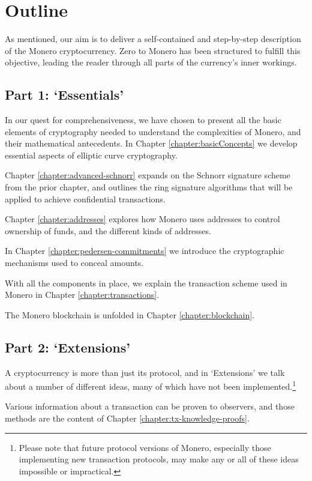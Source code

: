 \section{Outline}

As mentioned, our aim is to deliver a self-contained and step-by-step description of the Monero cryptocurrency. Zero to Monero has been structured to fulfill this objective, leading the reader through all parts of the currency’s inner workings.


\subsection{Part 1: `Essentials'}

In our quest for comprehensiveness, we have chosen to present all the basic elements of cryptography needed to understand the complexities of Monero, and their mathematical antecedents. In Chapter \ref{chapter:basicConcepts} we develop essential aspects of elliptic curve cryptography.

Chapter \ref{chapter:advanced-schnorr} expands on the Schnorr signature scheme from the prior chapter, and outlines the ring signature algorithms that will be applied to achieve confidential transactions.

Chapter \ref{chapter:addresses} explores how Monero uses addresses to control ownership of funds, and the different kinds of addresses.

In Chapter \ref{chapter:pedersen-commitments} we introduce the cryptographic mechanisms used to conceal amounts.

With all the components in place, we explain the transaction scheme used in Monero in Chapter \ref{chapter:transactions}.

The Monero blockchain is unfolded in Chapter \ref{chapter:blockchain}.


\subsection{Part 2: `Extensions'}

A cryptocurrency is more than just its protocol, and in `Extensions' we talk about a number of different ideas, many of which have not been implemented.\footnote{Please note that future protocol versions of Monero, especially those implementing new transaction protocols, may make any or all of these ideas impossible or impractical.}

Various information about a transaction can be proven to observers, and those methods are the content of Chapter \ref{chapter:tx-knowledge-proofs}.

